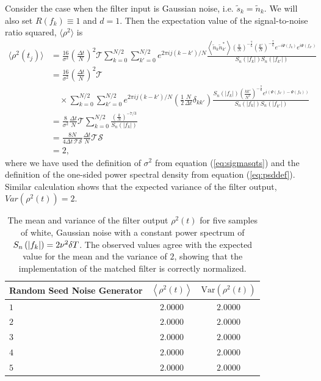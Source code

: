 Consider the case when the filter input is Gaussian noise, i.e. $\tilde{s}_k =
\tilde{n}_k$.  We will also set $R(f_k)\equiv 1$ and $d = 1$.  Then the expectation
value of the signal-to-noise ratio squared, $\langle \rho^2
\rangle$ is
\begin{equation}
\begin{split}
\langle \rho^2(t_j) \rangle &=
\frac{16}{\sigma^2}\left(\frac{\Delta t}{N}\right)^2 \mathcal{T}
  \sum_{k=0}^{N/2} \sum_{k'=0}^{N/2} 
  e^{2\pi ij(k-k')/N} 
  \frac{\left\langle \tilde{n}_k \tilde{n}_{k'}^{\ast} \right\rangle 
        \left(\frac{k}{N}\right)^{-\frac{7}{6}} \left(\frac{k'}{N}\right)^{-\frac{7}{6}}
        e^{-i\Psi(f_k)} e^{i\Psi(f_{k'})}}
       {S_n\left(\left|f_k\right|\right)S_n\left(\left|f_{k'}\right|\right)} \\
&= 
\frac{16}{\sigma^2}\left(\frac{\Delta t}{N}\right)^2 \mathcal{T} \\
&\quad\times
  \sum_{k=0}^{N/2} \sum_{k'=0}^{N/2} 
  e^{2\pi ij(k-k')/N} \left(\frac{1}{2} \frac{N}{\Delta t}  \delta_{kk'} \right) 
  \frac{ S_n\left(\left|f_k\right|\right)
        \left(\frac{kk'}{N^2}\right)^{-\frac{7}{6}}
        e^{i ( \Psi(f_{k'}) - \Psi(f_k) )}}
       {S_n\left(\left|f_k\right|\right)S_n\left(\left|f_{k'}\right|\right)} \\
&= 
\frac{8}{\sigma^2} \frac{\Delta t}{N} \mathcal{T}
  \sum_{k=0}^{N/2}
  \frac{ \left(\frac{k}{N}\right)^{-7/3} }
       {S_n\left(\left|f_k\right|\right)} \\
&= 
\frac{8N}{4\Delta t\, \mathcal{T}\mathcal{S}} \frac{\Delta t}{N} \mathcal{T} \mathcal{S} \\
&= 2,
\label{eq:filternorm}
\end{split}
\end{equation}
where we have used the definition of $\sigma^2$ from equation
(\ref{eq:sigmasqts}) and the definition of the one-sided power spectral
density from equation (\ref{eq:psddef}). Similar calculation shows that 
the expected variance of the filter output, $\mathit{Var}( \rho^2(t) ) = 2$. 
\begin{table}[htb]
  \begin{center}
  \begin{tabular}{l|c|c}
  Random Seed Noise Generator& $\left\langle \rho^2(t) \right\rangle$ & $\mathrm{Var}( \rho^2(t) )$\\
  \hline
  $1$ & $2.0000$ & $2.0000$ \\
  $2$ & $2.0000$ & $2.0000$ \\
  $3$ & $2.0000$ & $2.0000$ \\
  $4$ & $2.0000$ & $2.0000$ \\
  $5$ & $2.0000$ & $2.0000$ \\
  \end{tabular}
  \end{center}
  \caption{%
  The mean and variance of the filter output $\rho^2(t)$ for five samples of
  white, Gaussian noise with a constant power spectrum of $S_n\left(\left|f_{k}\right|\right) =
  2\nu^2\delta T$. The observed values agree with the expected value for the
  mean and the variance of $2$, showing that the implementation of the matched
  filter is correctly normalized.
  }
\label{t:normresults}
\end{table}

